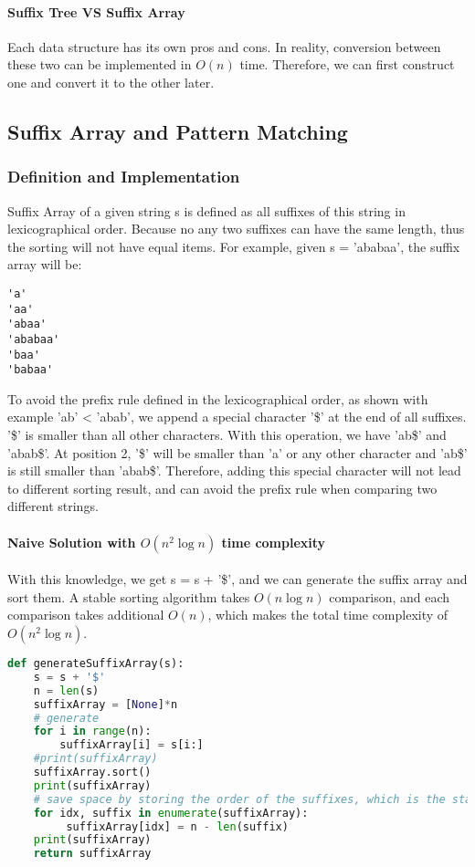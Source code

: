 \documentclass[../main.tex]{subfiles}
\begin{document}
\paragraph{Suffix Tree VS Suffix Array} Each data structure has its own pros and cons. In reality, conversion between these two can be implemented in $O(n)$ time. Therefore, we can first construct one and convert it to the other later. 

\subsection{Suffix Array and Pattern Matching}
\label{pattern_matching_subsec_suffix_array}
\subsubsection{Definition and Implementation}
Suffix Array of a given string s is defined as all suffixes of this string in lexicographical order. Because no any two suffixes can have the same length, thus the sorting will not have equal items. For example, given s = 'ababaa', the suffix array will be:
\begin{lstlisting}[numbers=none]
'a'
'aa'
'abaa'
'ababaa'
'baa'
'babaa'
\end{lstlisting}

To avoid the prefix rule defined in the lexicographical order, as shown with example 'ab' < 'abab', we append a special character '\$' at the end of all suffixes. '\$' is smaller than all other characters. With this operation, we have 'ab\$' and 'abab\$'. At position 2, '\$' will be smaller than 'a' or any other character and 'ab\$' is still smaller than 'abab\$'. Therefore, adding this special character will not lead to different sorting result, and can avoid the prefix rule when comparing two different strings. 

\paragraph{Naive Solution with $O(n^2\log n)$ time complexity} With this knowledge, we get s = s + '\$', and we can generate the suffix array and sort them. A stable sorting algorithm takes $O(n\log n)$ comparison, and each comparison takes additional $O(n)$, which makes the total time complexity of $O(n^2\log n)$. 
\begin{lstlisting}[language=Python]
def generateSuffixArray(s):
    s = s + '$'
    n = len(s)
    suffixArray = [None]*n
    # generate
    for i in range(n):
        suffixArray[i] = s[i:]
    #print(suffixArray)
    suffixArray.sort()
    print(suffixArray)
    # save space by storing the order of the suffixes, which is the starting index
    for idx, suffix in enumerate(suffixArray):
         suffixArray[idx] = n - len(suffix)
    print(suffixArray)
    return suffixArray
\end{lstlisting}
\end{document}
